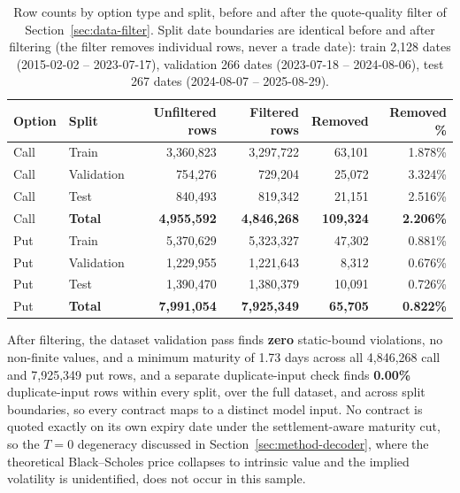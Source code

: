 \documentclass[11pt]{article}
\begin{document}
\begin{table}[t]
\centering
\caption{Row counts by option type and split, before and after the quote-quality filter of
Section~\ref{sec:data-filter}. Split date boundaries are identical before and after filtering (the
filter removes individual rows, never a trade date): train 2{,}128 dates (2015-02-02 -- 2023-07-17),
validation 266 dates (2023-07-18 -- 2024-08-06), test 267 dates (2024-08-07 -- 2025-08-29).}
\label{tab:retention}
\begin{tabular}{llrrrr}
\toprule
Option & Split & Unfiltered rows & Filtered rows & Removed & Removed \% \\
\midrule
Call & Train      & 3{,}360{,}823 & 3{,}297{,}722 & 63{,}101  & 1.878\% \\
Call & Validation & 754{,}276     & 729{,}204     & 25{,}072  & 3.324\% \\
Call & Test       & 840{,}493     & 819{,}342     & 21{,}151  & 2.516\% \\
Call & \textbf{Total} & \textbf{4{,}955{,}592} & \textbf{4{,}846{,}268} & \textbf{109{,}324} & \textbf{2.206\%} \\
\midrule
Put  & Train      & 5{,}370{,}629 & 5{,}323{,}327 & 47{,}302 & 0.881\% \\
Put  & Validation & 1{,}229{,}955 & 1{,}221{,}643 & 8{,}312  & 0.676\% \\
Put  & Test       & 1{,}390{,}470 & 1{,}380{,}379 & 10{,}091 & 0.726\% \\
Put  & \textbf{Total} & \textbf{7{,}991{,}054} & \textbf{7{,}925{,}349} & \textbf{65{,}705} & \textbf{0.822\%} \\
\bottomrule
\end{tabular}
\end{table}

After filtering, the dataset validation pass finds \textbf{zero} static-bound violations, no
non-finite values, and a minimum maturity of 1.73 days across all 4{,}846{,}268 call and 7{,}925{,}349
put rows, and a separate duplicate-input check finds \textbf{0.00\%} duplicate-input rows within every
split, over the full dataset, and across split boundaries, so every contract maps to a distinct model
input. No contract is quoted exactly on its own expiry
date under the settlement-aware maturity cut, so the $T{=}0$ degeneracy discussed in
Section~\ref{sec:method-decoder}, where the theoretical Black--Scholes price collapses to intrinsic
value and the implied volatility is unidentified, does not occur in this sample.
\end{document}
